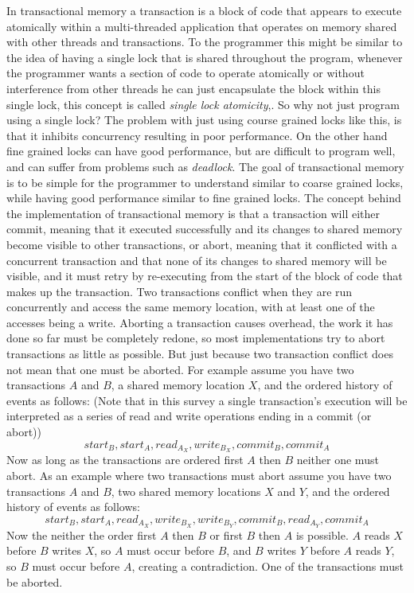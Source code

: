 In transactional memory a transaction is a block of code that appears to execute atomically within a multi-threaded application that operates on memory shared with other threads and transactions.
To the programmer this might be similar to the idea of having a single lock that is shared throughout the program, whenever the programmer wants a section of code to operate atomically or without interference from other threads he can just encapsulate the block within this single lock, this concept is called \emph{single lock atomicity},.
So why not just program using a single lock?
The problem with just using course grained locks like this, is that it inhibits concurrency resulting in poor performance.
On the other hand fine grained locks can have good performance, but are difficult to program well, and can suffer from problems such as \emph{deadlock}.
The goal of transactional memory is to be simple for the programmer to understand similar to coarse grained locks, while having good performance similar to fine grained locks.
The concept behind the implementation of transactional memory is that a transaction will either commit, meaning that it executed successfully and its changes to shared memory become visible to other transactions, or abort, meaning that it conflicted with a concurrent transaction and that none of its changes to shared memory will be visible, and it must retry by re-executing from the start of the block of code that makes up the transaction.
Two transactions conflict when they are run concurrently and access the same memory location, with at least one of the accesses being a write.
Aborting a transaction causes overhead, the work it has done so far must be completely redone, so most implementations try to abort transactions as little as possible.
But just because two transaction conflict does not mean that one must be aborted.
For example assume you have two transactions $A$ and $B$, a shared memory location $X$, and the ordered history of events as follows:
(Note that in this survey a single transaction's execution will be interpreted as a series of read and write operations ending in a commit (or abort))
$$ start_{B},start_{A}, read_{A_{X}}, write_{B_{X}}, commit_{B}, commit_{A}$$
Now as long as the transactions are ordered first $A$ then $B$ neither one must abort.
As an example where two transactions must abort assume you have two transactions $A$ and $B$, two shared memory locations $X$ and $Y$, and the ordered history of events as follows:
$$start_{B}, start_{A}, read_{A_{X}}, write_{B_{X}}, write_{B_{Y}}, commit_{B}, read_{A_{Y}}, commit_{A}$$
Now the neither the order first $A$ then $B$ or first $B$ then $A$ is possible.  $A$ reads $X$ before $B$ writes $X$, so $A$ must occur before $B$, and $B$ writes $Y$ before $A$ reads $Y$, so $B$ must occur before $A$, creating a contradiction.  One of the transactions must be aborted.

